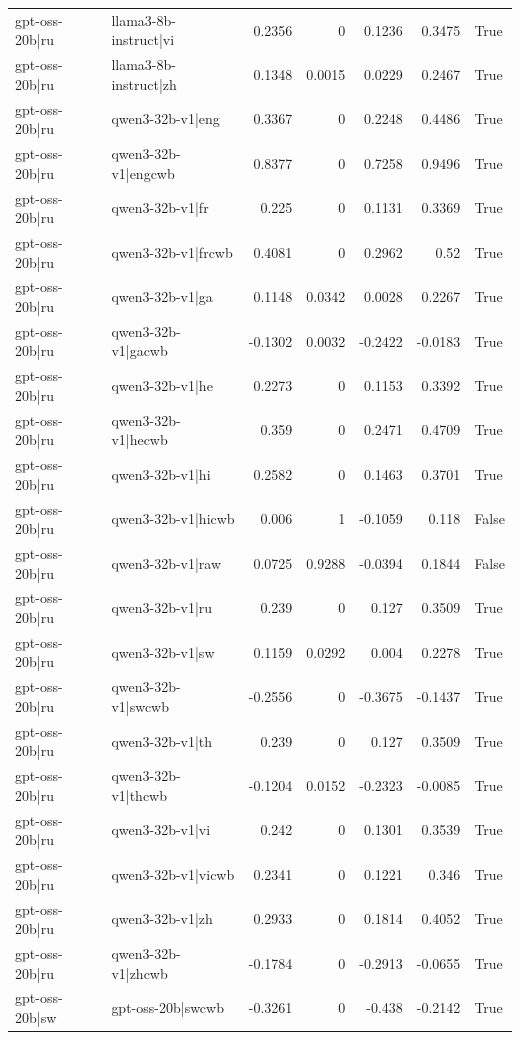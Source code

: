 \begin{table}
\begin{tabular}{l l r r r r l}
gpt-oss-20b|ru & llama3-8b-instruct|vi & 0.2356 & 0 & 0.1236 & 0.3475 & True \\
gpt-oss-20b|ru & llama3-8b-instruct|zh & 0.1348 & 0.0015 & 0.0229 & 0.2467 & True \\
gpt-oss-20b|ru & qwen3-32b-v1|eng & 0.3367 & 0 & 0.2248 & 0.4486 & True \\
gpt-oss-20b|ru & qwen3-32b-v1|engcwb & 0.8377 & 0 & 0.7258 & 0.9496 & True \\
gpt-oss-20b|ru & qwen3-32b-v1|fr & 0.225 & 0 & 0.1131 & 0.3369 & True \\
gpt-oss-20b|ru & qwen3-32b-v1|frcwb & 0.4081 & 0 & 0.2962 & 0.52 & True \\
gpt-oss-20b|ru & qwen3-32b-v1|ga & 0.1148 & 0.0342 & 0.0028 & 0.2267 & True \\
gpt-oss-20b|ru & qwen3-32b-v1|gacwb & -0.1302 & 0.0032 & -0.2422 & -0.0183 & True \\
gpt-oss-20b|ru & qwen3-32b-v1|he & 0.2273 & 0 & 0.1153 & 0.3392 & True \\
gpt-oss-20b|ru & qwen3-32b-v1|hecwb & 0.359 & 0 & 0.2471 & 0.4709 & True \\
gpt-oss-20b|ru & qwen3-32b-v1|hi & 0.2582 & 0 & 0.1463 & 0.3701 & True \\
gpt-oss-20b|ru & qwen3-32b-v1|hicwb & 0.006 & 1 & -0.1059 & 0.118 & False \\
gpt-oss-20b|ru & qwen3-32b-v1|raw & 0.0725 & 0.9288 & -0.0394 & 0.1844 & False \\
gpt-oss-20b|ru & qwen3-32b-v1|ru & 0.239 & 0 & 0.127 & 0.3509 & True \\
gpt-oss-20b|ru & qwen3-32b-v1|sw & 0.1159 & 0.0292 & 0.004 & 0.2278 & True \\
gpt-oss-20b|ru & qwen3-32b-v1|swcwb & -0.2556 & 0 & -0.3675 & -0.1437 & True \\
gpt-oss-20b|ru & qwen3-32b-v1|th & 0.239 & 0 & 0.127 & 0.3509 & True \\
gpt-oss-20b|ru & qwen3-32b-v1|thcwb & -0.1204 & 0.0152 & -0.2323 & -0.0085 & True \\
gpt-oss-20b|ru & qwen3-32b-v1|vi & 0.242 & 0 & 0.1301 & 0.3539 & True \\
gpt-oss-20b|ru & qwen3-32b-v1|vicwb & 0.2341 & 0 & 0.1221 & 0.346 & True \\
gpt-oss-20b|ru & qwen3-32b-v1|zh & 0.2933 & 0 & 0.1814 & 0.4052 & True \\
gpt-oss-20b|ru & qwen3-32b-v1|zhcwb & -0.1784 & 0 & -0.2913 & -0.0655 & True \\
gpt-oss-20b|sw & gpt-oss-20b|swcwb & -0.3261 & 0 & -0.438 & -0.2142 & True \\

\end{tabular}
\end{table}
